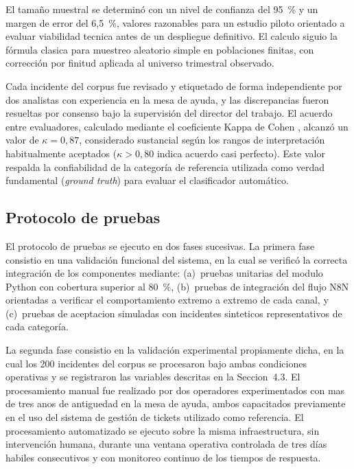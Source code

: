 El tamaño muestral se determinó con un nivel de confianza del 95~\% y un margen de error del 6,5~\%, valores razonables para un estudio piloto orientado a evaluar viabilidad tecnica antes de un despliegue definitivo. El calculo siguio la fórmula clasica para muestreo aleatorio simple en poblaciones finitas, con corrección por finitud aplicada al universo trimestral observado.

Cada incidente del corpus fue revisado y etiquetado de forma independiente por dos analistas con experiencia en la mesa de ayuda, y las discrepancias fueron resueltas por consenso bajo la supervisión del director del trabajo. El acuerdo entre evaluadores, calculado mediante el coeficiente Kappa de Cohen \parencite{Cohen1960_kappa}, alcanzó un valor de \(\kappa = 0{,}87\), considerado sustancial según los rangos de interpretación habitualmente aceptados (\(\kappa > 0{,}80\) indica acuerdo casi perfecto). Este valor respalda la confiabilidad de la categoría de referencia utilizada como verdad fundamental (\emph{ground truth}) para evaluar el clasificador automático.

\subsection{Protocolo de pruebas}

El protocolo de pruebas se ejecuto en dos fases sucesivas. La primera fase consistio en una validación funcional del sistema, en la cual se verificó la correcta integración de los componentes mediante: (a)~pruebas unitarias del modulo Python con cobertura superior al 80~\%, (b)~pruebas de integración del flujo N8N orientadas a verificar el comportamiento extremo a extremo de cada canal, y (c)~pruebas de aceptacion simuladas con incidentes sinteticos representativos de cada categoría.

La segunda fase consistio en la validación experimental propiamente dicha, en la cual los 200 incidentes del corpus se procesaron bajo ambas condiciones operativas y se registraron las variables descritas en la Seccion~4.3. El procesamiento manual fue realizado por dos operadores experimentados con mas de tres anos de antiguedad en la mesa de ayuda, ambos capacitados previamente en el uso del sistema de gestión de tickets utilizado como referencia. El procesamiento automatizado se ejecuto sobre la misma infraestructura, sin intervención humana, durante una ventana operativa controlada de tres días habiles consecutivos y con monitoreo continuo de los tiempos de respuesta.

